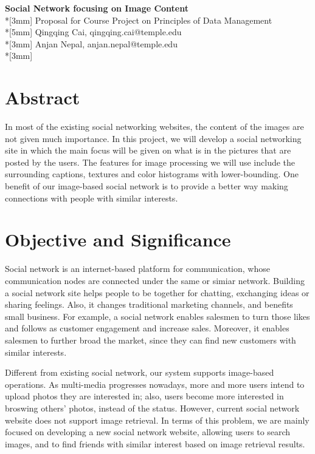 \documentclass[a4paper,12pt]{article}
\begin{document}
\begin{center}
{\Large{\bf Social Network focusing on Image Content}} \\*[3mm]
Proposal for Course Project on Principles of Data Management\\*[5mm]
Qingqing Cai, qingqing.cai@temple.edu\\*[3mm]
Anjan Nepal, anjan.nepal@temple.edu\\*[3mm]
\end{center}

\section*{Abstract}
In most of the existing social networking websites, the content of the images are not given much importance. In this project, we will develop a social networking site in which the main focus will be given on what is in the pictures that are posted by the users. The features for image processing we will use include the surrounding captions, textures and color histograms with lower-bounding. One benefit of our image-based social network is to provide a better way making connections with people with similar interests.

\section*{Objective and Significance}
Social network is an internet-based platform for communication, whose communication nodes are connected under the same or simiar network. Building a social network site helps people to be together for chatting, exchanging ideas or sharing feelings. Also, it changes traditional marketing channels, and benefits small business. For example, a social network enables salesmen to turn those likes and follows as customer engagement and increase sales. Moreover, it enables salesmen to further broad the market, since they can find new customers with similar interests.

Different from existing social network, our system supports image-based operations. As multi-media progresses nowadays, more and more users intend to upload photos they are interested in; also, users become more interested in broswing others' photos, instead of the status. However, current social network website does not support image retrieval. In terms of this problem, we are mainly focused on developing a new social network website, allowing users to search images, and to find friends with similar interest based on image retrieval results.
\end{document}
